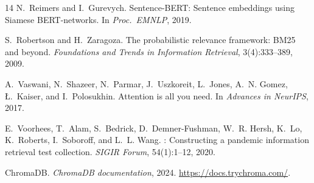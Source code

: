 \documentclass[11pt,a4paper]{article}
\begin{document}
\begin{thebibliography}{14}
N.~Reimers and I.~Gurevych.
\newblock Sentence-{BERT}: Sentence embeddings using {S}iamese {BERT}-networks.
\newblock In \emph{Proc.\ EMNLP}, 2019.

S.~Robertson and H.~Zaragoza.
\newblock The probabilistic relevance framework: {BM25} and beyond.
\newblock \emph{Foundations and Trends in Information Retrieval}, 3(4):333--389, 2009.

A.~Vaswani, N.~Shazeer, N.~Parmar, J.~Uszkoreit, L.~Jones, A.~N. Gomez, {\L}.~Kaiser, and I.~Polosukhin.
\newblock Attention is all you need.
\newblock In \emph{Advances in NeurIPS}, 2017.

E.~Voorhees, T.~Alam, S.~Bedrick, D.~Demner-Fushman, W.~R. Hersh, K.~Lo, K.~Roberts, I.~Soboroff, and L.~L. Wang.
: Constructing a pandemic information retrieval test collection.
\newblock \emph{SIGIR Forum}, 54(1):1--12, 2020.

{ChromaDB}.
\newblock \emph{ChromaDB documentation}, 2024.
\newblock \url{https://docs.trychroma.com/}.

\end{thebibliography}
\end{document}
